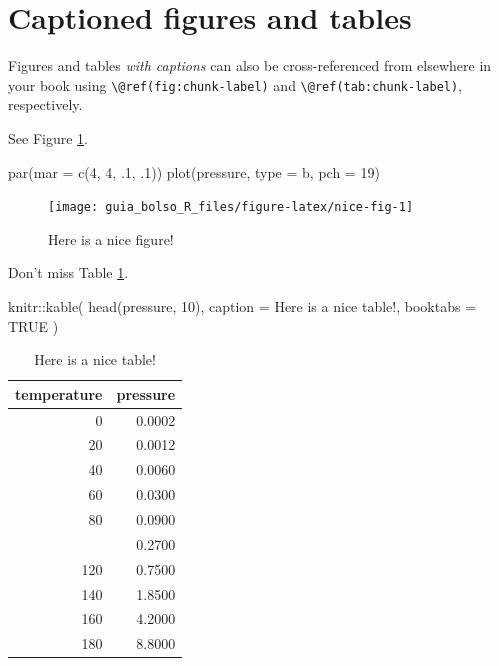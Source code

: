 \documentclass[
]{book}
\newenvironment{Shaded}{\begin{snugshade}}{\end{snugshade}}
\newcommand{\AttributeTok}[1]{\textcolor[rgb]{0.77,0.63,0.00}{#1}}
\newcommand{\ConstantTok}[1]{\textcolor[rgb]{0.00,0.00,0.00}{#1}}
\newcommand{\DecValTok}[1]{\textcolor[rgb]{0.00,0.00,0.81}{#1}}
\newcommand{\FunctionTok}[1]{\textcolor[rgb]{0.00,0.00,0.00}{#1}}
\newcommand{\NormalTok}[1]{#1}
\newcommand{\SpecialCharTok}[1]{\textcolor[rgb]{0.00,0.00,0.00}{#1}}
\newcommand{\StringTok}[1]{\textcolor[rgb]{0.31,0.60,0.02}{#1}}
\theoremstyle{definition}
\theoremstyle{definition}
\theoremstyle{definition}
\theoremstyle{definition}
\theoremstyle{remark}
\begin{document}
\hypertarget{captioned-figures-and-tables}{%
\section{Captioned figures and tables}\label{captioned-figures-and-tables}}

Figures and tables \emph{with captions} can also be cross-referenced from elsewhere in your book using \texttt{\textbackslash{}@ref(fig:chunk-label)} and \texttt{\textbackslash{}@ref(tab:chunk-label)}, respectively.

See Figure \ref{fig:nice-fig}.

\begin{Shaded}
\begin{Highlighting}[]
\FunctionTok{par}\NormalTok{(}\AttributeTok{mar =} \FunctionTok{c}\NormalTok{(}\DecValTok{4}\NormalTok{, }\DecValTok{4}\NormalTok{, .}\DecValTok{1}\NormalTok{, .}\DecValTok{1}\NormalTok{))}
\FunctionTok{plot}\NormalTok{(pressure, }\AttributeTok{type =} \StringTok{\textquotesingle{}b\textquotesingle{}}\NormalTok{, }\AttributeTok{pch =} \DecValTok{19}\NormalTok{)}
\end{Highlighting}
\end{Shaded}

\begin{figure}

{\centering \texttt{[image: guia\_bolso\_R\_files/figure-latex/nice-fig-1]} 

}

\caption{Here is a nice figure!}\label{fig:nice-fig}
\end{figure}

Don't miss Table \ref{tab:nice-tab}.

\begin{Shaded}
\begin{Highlighting}[]
\NormalTok{knitr}\SpecialCharTok{::}\FunctionTok{kable}\NormalTok{(}
  \FunctionTok{head}\NormalTok{(pressure, }\DecValTok{10}\NormalTok{), }\AttributeTok{caption =} \StringTok{\textquotesingle{}Here is a nice table!\textquotesingle{}}\NormalTok{,}
  \AttributeTok{booktabs =} \ConstantTok{TRUE}
\NormalTok{)}
\end{Highlighting}
\end{Shaded}

\begin{table}

\caption{\label{tab:nice-tab}Here is a nice table!}
\centering
\begin{tabular}[t]{rr}
\toprule
temperature & pressure\\
\midrule
0 & 0.0002\\
20 & 0.0012\\
40 & 0.0060\\
60 & 0.0300\\
80 & 0.0900\\
\addlinespace
100 & 0.2700\\
120 & 0.7500\\
140 & 1.8500\\
160 & 4.2000\\
180 & 8.8000\\
\bottomrule
\end{tabular}
\end{table}
\end{document}

